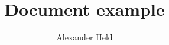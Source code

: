 \documentclass{article}
\begin{document}
\title{Document example}
\author{Alexander Held}

\maketitle



\printbibliography
\end{document}
